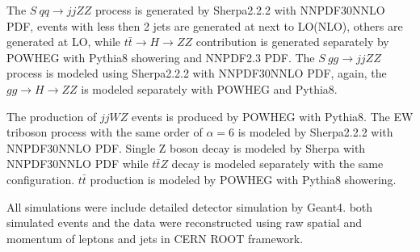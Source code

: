 \documentclass[12pt]{article}
\begin{document}
        The $S\ qq \rightarrow jjZZ$ process is generated by Sherpa2.2.2 with NNPDF30NNLO PDF, events with less then 2 jets are generated at next to LO(NLO), others are generated 
        at LO, while $t\bar{t}\rightarrow {H} \rightarrow ZZ$ contribution is generated separately by POWHEG\cite{1007.3893} with Pythia8 showering and NNPDF2.3 PDF.
        The $S\ gg \rightarrow jjZZ$ process is modeled using Sherpa2.2.2 with NNPDF30NNLO PDF, again, the $gg\rightarrow {H}\rightarrow ZZ$ is modeled separately with POWHEG and Pythia8.

        \par The production of $jjWZ$ events is produced by POWHEG with Pythia8. The EW triboson process with the same order of $\alpha=6$ is modeled by Sherpa2.2.2 with NNPDF30NNLO PDF.
        Single Z boson decay is modeled by Sherpa with NNPDF30NNLO PDF while $t\bar{t}Z$ decay is modeled separately with the same configuration. $t\bar{t}$ production is modeled by 
        POWHEG with Pythia8 showering.

        \par All simulations were include detailed detector simulation by Geant4\cite{AGOSTINELLI2003250}.  
        both simulated events and the data were reconstructed using raw spatial and momentum of leptons and 
        jets in CERN ROOT\cite{ANTCHEVA20092499} framework.
\end{document}

